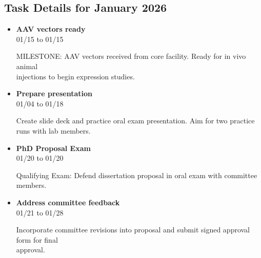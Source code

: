 \documentclass[landscape,a4paper]{article}
\begin{document}
\subsection{Task Details for January 2026}
\begin{itemize}[leftmargin=1cm, itemsep=0.8em]
    \item \textcolor{other}{\textbf{AAV vectors ready}}\\[0.2em]
          \textcolor{black!70}{\small 01/15 to 01/15}
\\[0.3em]
          \begin{minipage}[t]{0.85\textwidth}
          \textcolor{black!80}{MILESTONE: AAV vectors received from core facility. Ready for in vivo animal\\[0.1em]
          injections to begin expression studies.}
          \end{minipage}

    \item \textcolor{researchcore}{\textbf{Prepare presentation}}\\[0.2em]
          \textcolor{black!70}{\small 01/04 to 01/18}
\\[0.3em]
          \begin{minipage}[t]{0.85\textwidth}
          \textcolor{black!80}{Create slide deck and practice oral exam presentation. Aim for two practice\\[0.1em]
          runs with lab members.}
          \end{minipage}

    \item \textcolor{researchcore}{\textbf{PhD Proposal Exam}}\\[0.2em]
          \textcolor{black!70}{\small 01/20 to 01/20}
\\[0.3em]
          \begin{minipage}[t]{0.85\textwidth}
          \textcolor{black!80}{Qualifying Exam: Defend dissertation proposal in oral exam with committee members.}
          \end{minipage}

    \item \textcolor{researchcore}{\textbf{Address committee feedback}}\\[0.2em]
          \textcolor{black!70}{\small 01/21 to 01/28}
\\[0.3em]
          \begin{minipage}[t]{0.85\textwidth}
          \textcolor{black!80}{Incorporate committee revisions into proposal and submit signed approval form for final\\[0.1em]
          approval.}
          \end{minipage}

\end{itemize}
\end{document}

